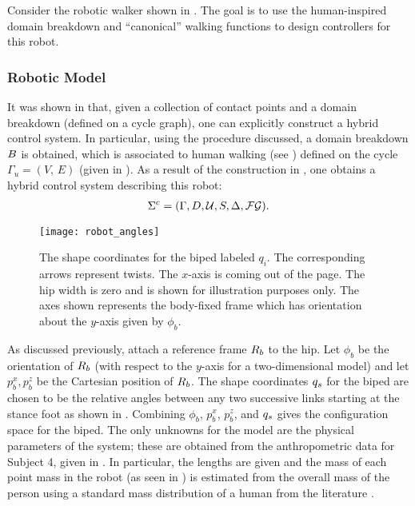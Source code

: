 Consider the robotic walker shown in .
%
The goal is to use the human-inspired domain breakdown and ``canonical'' walking
functions to design controllers for this robot.


\subsubsection{Robotic Model}

It was shown in  that, given a collection of contact
points and a domain breakdown (defined on a cycle graph), one can explicitly
construct a hybrid control system.
%
In particular, using the procedure discussed, a domain breakdown $B$ is
obtained, which is associated to human walking (see
) defined on the cycle $\Gamma_u = (V, \, E)$ (given
in ).
%
As a result of the construction in , one obtains a
hybrid control system describing this robot:
%
\begin{align}
  \label{eq:hcstime}
  \Sigma^{c} = (\Gamma, D, \mathcal{U}, S, \Delta, \mathcal{FG}).
\end{align}
%
\begin{figure}[t!]
  \centering
  \texttt{[image: robot\_angles]}
  \caption[The shape coordinates for the biped labeled $q_i$.]{The shape
    coordinates for the biped labeled $q_i$.
    The corresponding arrows represent twists. The $x$-axis is coming out of the
    page.
    The hip width is zero and is shown for illustration purposes only.
    The axes shown represents the body-fixed frame which has orientation about
    the $y$-axis given by $\phi_b$.}
  \label{fig:shapecoords}
\end{figure}
%
As discussed previously, attach a reference frame $R_{b}$ to the hip. Let $\phi_b$
be the orientation of $R_{b}$ (with respect to the $y$-axis for a two-dimensional
model) and let $p_b^x, p_b^z$ be the Cartesian position of $R_{b}$.
%
The shape coordinates $q_{s}$ for the biped are chosen to be the relative angles
between any two successive links starting at the stance foot as shown in
.
%
Combining $\phi_b$, $p_b^x$, $p_b^z$, and $q_{s}$ gives the configuration space
for the biped.
%
The only unknowns for the model are the physical parameters of the system;
%
these are obtained from the anthropometric data for Subject 4, given in
.
%
In particular, the lengths are given and the mass of each point mass in the
robot (as seen in ) is estimated from the overall
mass of the person using a standard mass distribution of a human from the
literature \cite{Winter2009}.


